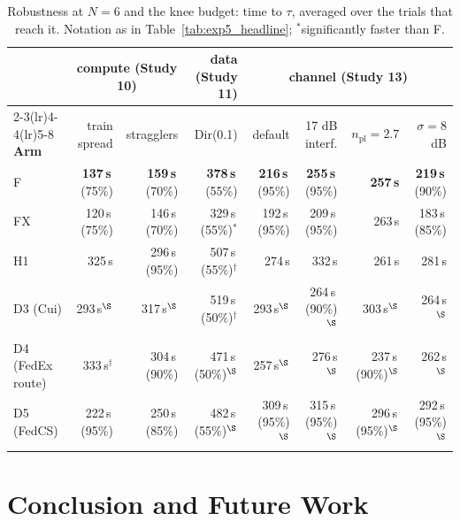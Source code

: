 \documentclass[conference]{IEEEtran}
\begin{document}
\begin{table}[t]
\centering
\caption{Robustness at $N=6$ and the knee budget: time to $\tau$, averaged over the trials that reach it. Notation as in Table~\ref{tab:exp5_headline}; $^{\ast}$significantly faster than F.}
\label{tab:exp5_robust}
\small
\begin{tabular}{l rr r rrrr}
\toprule
 & \multicolumn{2}{c}{compute (Study 10)} & data (Study 11) & \multicolumn{4}{c}{channel (Study 13)} \\
\cmidrule(lr){2-3}\cmidrule(lr){4-4}\cmidrule(lr){5-8}
\textbf{Arm} & train spread & stragglers & Dir(0.1) & default & 17 dB interf. & $n_{\text{pl}}{=}2.7$ & $\sigma{=}8$ dB \\
\midrule
F & \textbf{137\,s}\,{\scriptsize(75\%)} & \textbf{159\,s}\,{\scriptsize(70\%)} & \textbf{378\,s}\,{\scriptsize(55\%)} & \textbf{216\,s}\,{\scriptsize(95\%)} & \textbf{255\,s}\,{\scriptsize(95\%)} & \textbf{257\,s} & \textbf{219\,s}\,{\scriptsize(90\%)} \\
FX & 120\,s\,{\scriptsize(75\%)} & 146\,s\,{\scriptsize(70\%)} & 329\,s\,{\scriptsize(55\%)}$^{\ast}$ & 192\,s\,{\scriptsize(95\%)} & 209\,s\,{\scriptsize(95\%)} & 263\,s & 183\,s\,{\scriptsize(85\%)} \\
H1 & 325\,s & 296\,s\,{\scriptsize(95\%)} & 507\,s\,{\scriptsize(55\%)}$^{\dagger}$ & 274\,s & 332\,s & 261\,s & 281\,s \\
D3 (Cui) & 293\,s$^{\S}$ & 317\,s$^{\S}$ & 519\,s\,{\scriptsize(50\%)}$^{\dagger}$ & 293\,s$^{\S}$ & 264\,s\,{\scriptsize(90\%)}$^{\S}$ & 303\,s$^{\S}$ & 264\,s$^{\S}$ \\
D4 (FedEx route) & 333\,s$^{\dagger}$ & 304\,s\,{\scriptsize(90\%)} & 471\,s\,{\scriptsize(50\%)}$^{\S}$ & 257\,s$^{\S}$ & 276\,s$^{\S}$ & 237\,s\,{\scriptsize(90\%)}$^{\S}$ & 262\,s$^{\S}$ \\
D5 (FedCS) & 222\,s\,{\scriptsize(95\%)} & 250\,s\,{\scriptsize(85\%)} & 482\,s\,{\scriptsize(55\%)}$^{\S}$ & 309\,s\,{\scriptsize(95\%)}$^{\S}$ & 315\,s\,{\scriptsize(95\%)}$^{\S}$ & 296\,s\,{\scriptsize(95\%)}$^{\S}$ & 292\,s\,{\scriptsize(95\%)}$^{\S}$ \\
\bottomrule
\end{tabular}
\end{table}

\section{Conclusion and Future Work}
\label{sec:conclusion}
\end{document}
